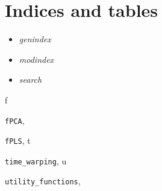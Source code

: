 \documentclass[letterpaper,10pt,english]{sphinxmanual}
\begin{document}
\chapter{Indices and tables}
\label{index:indices-and-tables}\begin{itemize}
\item {} 
\emph{genindex}

\item {} 
\emph{modindex}

\item {} 
\emph{search}

\end{itemize}


\renewcommand{\indexname}{Python Module Index}
\begin{theindex}
\def\bigletter#1{{\Large\sffamily#1}\nopagebreak\vspace{1mm}}
\bigletter{f}
\item {\texttt{fPCA}}, \pageref{fPCA:module-fPCA}
\item {\texttt{fPLS}}, \pageref{fPLS:module-fPLS}
\indexspace
\bigletter{t}
\item {\texttt{time\_warping}}, \pageref{time_warping:module-time_warping}
\indexspace
\bigletter{u}
\item {\texttt{utility\_functions}}, \pageref{utility_functions:module-utility_functions}
\end{theindex}

\renewcommand{\indexname}{Index}
\printindex
\end{document}
